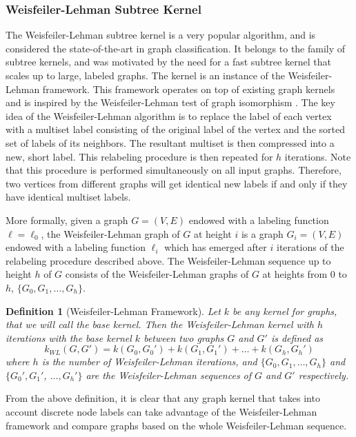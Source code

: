 \documentclass[twoside,11pt]{article}
\newtheorem{definition}{Definition}
\begin{document}
\subsubsection{Weisfeiler-Lehman Subtree Kernel}
The Weisfeiler-Lehman subtree kernel is a very popular algorithm, and is considered the state-of-the-art in graph classification.
It belongs to the family of subtree kernels, and was motivated by the need for a fast subtree kernel that scales up to large, labeled graphs.
The kernel is an instance of the Weisfeiler-Lehman framework.
This framework operates on top of existing graph kernels and is inspired by the Weisfeiler-Lehman test of graph isomorphism .
The key idea of the Weisfeiler-Lehman algorithm is to replace the label of each vertex with a multiset label consisting of the original label of the vertex and the sorted set of labels of its neighbors.
The resultant multiset is then compressed into a new, short label.
This relabeling procedure is then repeated for $h$ iterations.
Note that this procedure is performed simultaneously on all input graphs.
Therefore, two vertices from different graphs will get identical new labels if and only if they have identical multiset labels.

More formally, given a graph $G=(V,E)$ endowed with a labeling function $\ell=\ell_0$, the Weisfeiler-Lehman graph of $G$ at height $i$ is a graph $G_i=(V,E)$ endowed with a labeling function $\ell_i$ which has emerged after $i$ iterations of the relabeling procedure described above.
The Weisfeiler-Lehman sequence up to height $h$ of $G$ consists of the Weisfeiler-Lehman graphs of $G$ at heights from $0$ to $h$, $\{ G_0,G_1,\ldots,G_h\}$. 
\begin{definition}[Weisfeiler-Lehman Framework]
  Let $k$ be any kernel for graphs, that we will call the base kernel.
  Then the Weisfeiler-Lehman kernel with $h$ iterations with the base kernel $k$ between two graphs $G$ and $G'$ is defined as
  \begin{equation}
    k_{WL}(G,G') = k(G_0,G_0') + k(G_1,G_1') + \ldots + k(G_h,G_h')
  \end{equation}
  where $h$ is the number of Weisfeiler-Lehman iterations, and $\{ G_0,G_1,\ldots,G_h\}$ and $\{ G_0',G_1'$, $\ldots,G_h'\}$ are the Weisfeiler-Lehman sequences of $G$ and $G'$ respectively.
\end{definition}
From the above definition, it is clear that any graph kernel that takes into account discrete node labels can take advantage of the Weisfeiler-Lehman framework and compare graphs based on the whole Weisfeiler-Lehman sequence.
\end{document}
